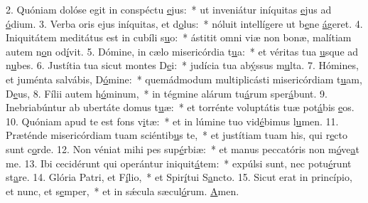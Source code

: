 2. Quóniam dolóse egit in conspéctu \uline{e}jus:~* ut inveniátur iníquitas \uline{e}jus ad \uline{ó}dium.
3. Verba oris ejus iníquitas, et d\uline{o}lus:~* nóluit intellígere ut b\uline{e}ne \uline{á}geret.
4. Iniquitátem meditátus est in cubíli s\uline{u}o:~* ástitit omni viæ non bonæ, malítiam autem n\uline{o}n od\uline{í}vit.
5. Dómine, in cælo misericórdia t\uline{u}a:~* et véritas tua \uline{u}sque ad n\uline{u}bes.
6. Justítia tua sicut montes D\uline{e}i:~* judícia tua ab\uline{ý}ssus m\uline{u}lta.
7. Hómines, et juménta salvábis, D\uline{ó}mine:~* quemádmodum multiplicásti misericórdiam t\uline{u}am, D\uline{e}us,
8. Fílii autem h\uline{ó}minum,~* in tégmine alárum tu\uline{á}rum sper\uline{á}bunt.
9. Inebriabúntur ab ubertáte domus t\uline{u}æ:~* et torrénte voluptátis tuæ pot\uline{á}bis \uline{e}os.
10. Quóniam apud te est fons v\uline{i}tæ:~* et in lúmine tuo vid\uline{é}bimus l\uline{u}men.
11. Præténde misericórdiam tuam sciéntib\uline{u}s te,~* et justítiam tuam his, qui r\uline{e}cto sunt c\uline{o}rde.
12. Non véniat mihi pes sup\uline{é}rbiæ:~* et manus peccatóris non m\uline{ó}ve\uline{a}t me.
13. Ibi cecidérunt qui operántur iniquit\uline{á}tem:~* expúlsi sunt, nec potu\uline{é}runt st\uline{a}re.
14. Glória Patri, et F\uline{í}lio,~* et Spir\uline{í}tui S\uline{a}ncto.
15. Sicut erat in princípio, et nunc, et s\uline{e}mper,~* et in sǽcula sæcul\uline{ó}rum. \uline{A}men.
